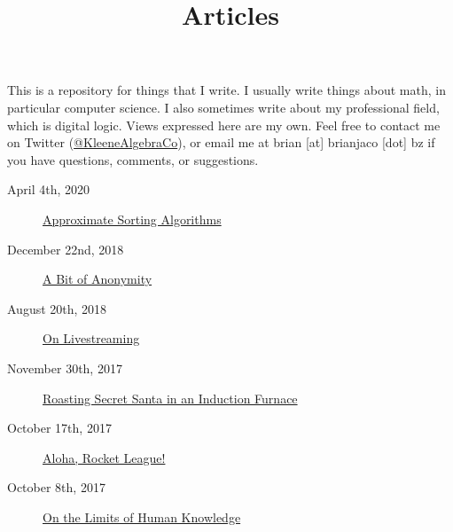 \documentclass{article}
\title{Articles}
\date{}
\begin{document}
\maketitle

This is a repository for things that I write. I usually write things about math, in particular computer science. I also sometimes write about my professional field, which is digital logic. Views expressed here are my own. Feel free to contact me on Twitter (\href{https://twitter.com/KleeneAlgebraCo}{@KleeneAlgebraCo}), or email me at brian [at] brianjaco [dot] bz if you have questions, comments, or suggestions.

\begin{description}
\item[April 4th, 2020] \href{approximate-sorting-algorithms/index.html}{Approximate Sorting Algorithms}
\item[December 22nd, 2018] \href{a-bit-anonymous/index.html}{A Bit of Anonymity}
\item[August 20th, 2018] \href{on-livestreaming/index.html}{On Livestreaming}
\item[November 30th, 2017] \href{secret-santa/index.html}{Roasting Secret Santa in an Induction Furnace}
\item[October 17th, 2017] \href{aloha-rocket-league/index.html}{Aloha, Rocket League!}
\item[October 8th, 2017] \href{limits-of-human-knowledge/index.html}{On the Limits of Human Knowledge}
\end{description}
\end{document}
